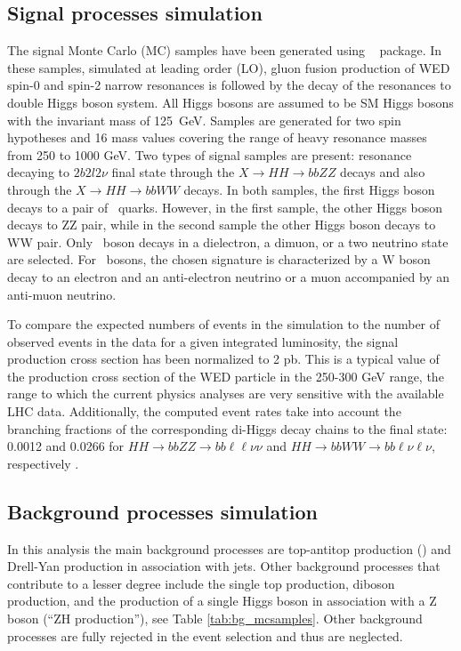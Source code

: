\begin{small}
\subsection{Signal processes simulation\label{sec:signalMC}}

The signal Monte Carlo (MC) samples  have been generated using {\MGMCatNLO} ~\cite{Alwall:2014hca} package. In these samples, simulated at leading order (LO), gluon fusion production of WED spin-0 and spin-2 narrow resonances is
followed by the decay of the resonances to double Higgs boson system. All Higgs bosons are assumed to be SM Higgs bosons with the invariant mass of 125~GeV. Samples are generated for two spin hypotheses and 16 mass values covering the range of heavy resonance masses from 250 to 1000 GeV. Two types of signal samples are present: resonance decaying to $2b 2l 2\nu$ final state through the $X \rightarrow HH \rightarrow bbZZ$ decays and also through the $X \rightarrow HH \rightarrow bbWW$ decays. In both samples, the first Higgs boson decays to a pair of \PQb ~quarks. However, in the first sample, the other Higgs boson decays to ZZ pair, while in the second sample the other Higgs boson decays to WW pair. Only \PZ ~boson decays in a dielectron,  a dimuon, or a two neutrino state are selected. For \PW ~bosons, the chosen signature is characterized by a W boson decay to an electron and an anti-electron neutrino or a muon accompanied by an anti-muon neutrino.

To compare the expected numbers of events in the simulation to the number of observed events in the data for a given integrated luminosity, the signal production cross section has been normalized to 2 pb. This is a typical value of the production cross section of the WED particle in the 250-300 GeV range, the range to which the current physics analyses are very sensitive with the available LHC data. Additionally, the computed event rates take into account the branching fractions of the corresponding di-Higgs decay chains to the final state: 0.0012 and 0.0266 for $HH\to bbZZ\to bb\ell\ell\nu\nu$ and $HH\to bbWW\to bb\ell\nu\ell\nu$, respectively \cite{CERNYR4}.

\subsection{Background processes simulation\label{sec:bkgMC}}
In this analysis the main background processes are top-antitop production (\ttbar) and Drell-Yan production in association with jets. 
Other background processes that contribute to a lesser degree include the single top production, diboson production, and the production of a single Higgs boson in association with a Z boson (``ZH production''), see Table \ref{tab:bg_mcsamples}. Other background processes are fully rejected in the event selection and thus are neglected.  


\end{small}
